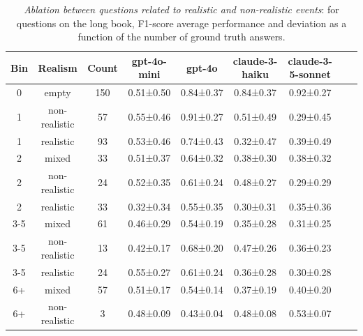 \documentclass{article}
\begin{document}
\begin{table}[htbp]
\caption{\textit{Ablation between questions related to realistic and non-realistic events}: for questions on the long book, F1-score average performance and deviation as a function of the number of ground truth answers.}
\label{tab:results_200_get_all_questions_ablation_realistic}
\centering
\begin{tabular}{@{}ccccccccc@{}}
\toprule
\bf Bin & \bf Realism & \bf Count & gpt-4o-mini & gpt-4o & claude-3-haiku & claude-3-5-sonnet \\ \midrule
0 & empty & 150 & 0.51±0.50 & 0.84±0.37 & 0.84±0.37 & 0.92±0.27  \\ \midrule
1 & non-realistic & 57 & 0.55±0.46 & 0.91±0.27 & 0.51±0.49 & 0.29±0.45  \\
1 & realistic & 93 & 0.53±0.46 & 0.74±0.43 & 0.32±0.47 & 0.39±0.49  \\ \midrule
2 & mixed & 33 & 0.51±0.37 & 0.64±0.32 & 0.38±0.30 & 0.38±0.32 \\
2 & non-realistic & 24 & 0.52±0.35 & 0.61±0.24 & 0.48±0.27 & 0.29±0.29 \\
2 & realistic & 33 & 0.32±0.34 & 0.55±0.35 & 0.30±0.31 & 0.35±0.36  \\ \midrule
3-5 & mixed & 61 & 0.46±0.29 & 0.54±0.19 & 0.35±0.28 & 0.31±0.25  \\
3-5 & non-realistic & 13 & 0.42±0.17 & 0.68±0.20 & 0.47±0.26 & 0.36±0.23  \\
3-5 & realistic & 24 & 0.55±0.27 & 0.61±0.24 & 0.36±0.28 & 0.30±0.28  \\ \midrule
6+ & mixed & 57 & 0.51±0.17 & 0.54±0.14 & 0.37±0.19 & 0.40±0.20 \\
6+ & non-realistic & 3 & 0.48±0.09 & 0.43±0.04 & 0.48±0.08 & 0.53±0.07\\ \bottomrule
\end{tabular}
\end{table}
\end{document}
